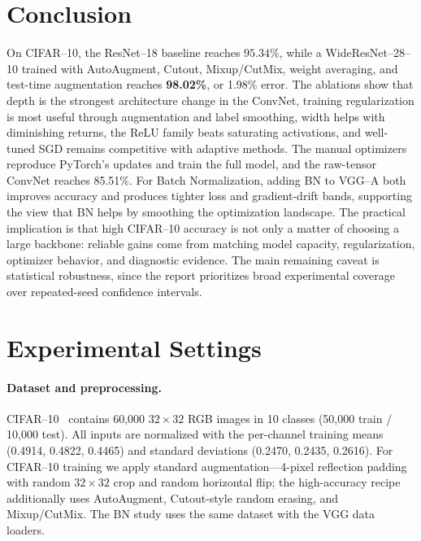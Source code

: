 \documentclass[11pt]{article}
\newcommand{\bestAcc}{98.02}     %
\newcommand{\bestErr}{1.98}      %
\newcommand{\manualNetAcc}{85.51} %
\begin{document}
\section{Conclusion}
On CIFAR--10, the ResNet--18 baseline reaches $95.34\%$, while a WideResNet--28--10
trained with AutoAugment, Cutout, Mixup/CutMix, weight averaging, and test-time
augmentation reaches \textbf{\bestAcc\%}, or \bestErr\% error. The ablations
show that depth is the strongest architecture change in the ConvNet,
training regularization is most useful through augmentation and label
smoothing, width helps with diminishing returns, the ReLU family beats
saturating activations, and well-tuned SGD remains competitive with adaptive
methods. The manual optimizers reproduce PyTorch's updates and train the full
model, and the raw-tensor ConvNet reaches \manualNetAcc\%. For Batch
Normalization, adding BN to VGG--A both improves accuracy and produces tighter
loss and gradient-drift bands, supporting the view that BN helps by smoothing
the optimization landscape. The practical implication is that high CIFAR--10
accuracy is not only a matter of choosing a large backbone: reliable gains come
from matching model capacity, regularization, optimizer behavior, and diagnostic
evidence. The main remaining caveat is statistical robustness, since the report
prioritizes broad experimental coverage over repeated-seed
confidence intervals.




\appendix
\section{Experimental Settings}
\label{sec:settings}

\paragraph{Dataset and preprocessing.}
CIFAR--10~\citep{krizhevsky2009learning} contains 60{,}000 $32\times32$ RGB
images in 10 classes (50{,}000 train / 10{,}000 test). All inputs are normalized
with the per-channel training means (0.4914, 0.4822, 0.4465) and standard
deviations (0.2470, 0.2435, 0.2616). For CIFAR--10 training we apply standard
augmentation---4-pixel reflection padding with random $32\times32$ crop and
random horizontal flip; the high-accuracy recipe
additionally uses AutoAugment, Cutout-style random erasing, and Mixup/CutMix.
The BN study uses the same dataset with the VGG data loaders.
\end{document}
